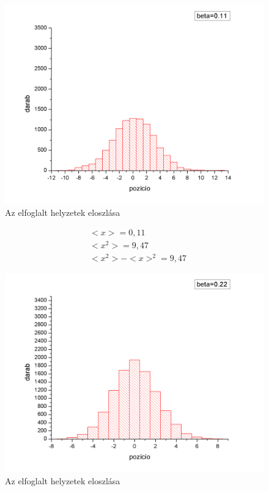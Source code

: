 \documentclass[paper=a4, fontsize=11pt]{article}
\begin{document}
\begin{figure}[H]
\includegraphics[width=\textwidth]{2.png}
\caption{Az elfoglalt helyzetek eloszlása}
\end{figure}

\begin{align}
&<x>= 0,11\\
&<x^2>=9,47\\
&<x^2>-<x>^2=9,47
\end{align}




\begin{figure}[H]
\includegraphics[width=\textwidth]{3.png}
\caption{Az elfoglalt helyzetek eloszlása}
\end{figure}
\end{document}
